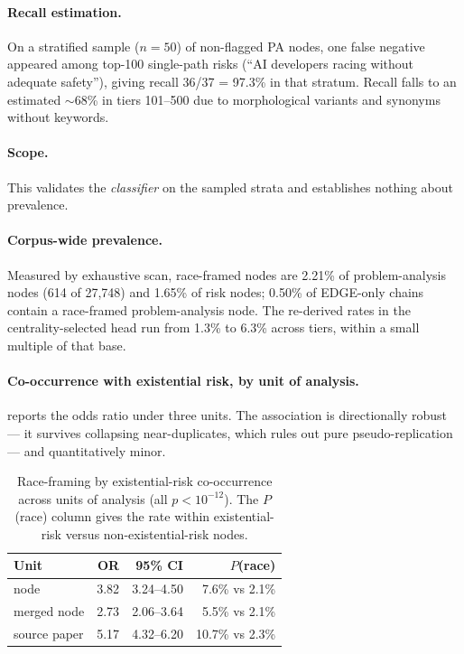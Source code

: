 \documentclass[10pt,twocolumn,letterpaper]{article}
\begin{document}
\paragraph{Recall estimation.} On a stratified sample ($n{=}50$) of non-flagged PA nodes,
one false negative appeared among top-100 single-path risks (``AI developers racing
without adequate safety''), giving recall 36/37 = 97.3\% in that stratum. Recall falls to
an estimated $\sim$68\% in tiers 101--500 due to morphological variants and synonyms
without keywords.

\paragraph{Scope.} This validates the \emph{classifier} on the sampled strata and
establishes nothing about prevalence.

\paragraph{Corpus-wide prevalence.} Measured by exhaustive scan, race-framed nodes are
2.21\% of problem-analysis nodes (614 of 27{,}748) and 1.65\% of risk nodes; 0.50\% of
EDGE-only chains contain a race-framed problem-analysis node. The re-derived rates in the
centrality-selected head run from 1.3\% to 6.3\% across tiers, within a small multiple of
that base.

\paragraph{Co-occurrence with existential risk, by unit of analysis.}
 reports the odds ratio under three units. The association is
directionally robust --- it survives collapsing near-duplicates, which rules out pure
pseudo-replication --- and quantitatively minor.

\begin{table}[h]
\centering
\small
\begin{tabular}{lrrr}
\toprule
\textbf{Unit} & \textbf{OR} & \textbf{95\% CI} & \textbf{$P$(race)} \\
\midrule
node               & 3.82 & 3.24--4.50 & 7.6\% vs 2.1\% \\
merged node        & 2.73 & 2.06--3.64 & 5.5\% vs 2.1\% \\
source paper       & 5.17 & 4.32--6.20 & 10.7\% vs 2.3\% \\
\bottomrule
\end{tabular}
\caption{Race-framing by existential-risk co-occurrence across units of analysis (all
$p < 10^{-12}$). The $P$(race) column gives the rate within existential-risk versus
non-existential-risk nodes.}
\label{tab:race}
\end{table}
\end{document}
